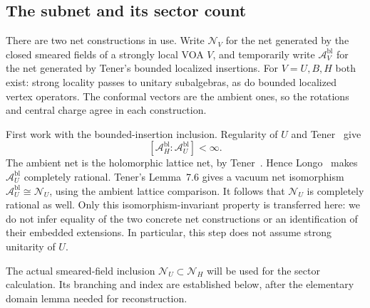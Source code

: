 \subsection{The subnet and its sector count}
\label{subsec:analytic-net-count}

There are two net constructions in use.  Write $\mathcal N_V$ for the
net generated by the closed smeared fields of a strongly local VOA $V$,
and temporarily write $\mathcal A_V^{\mathrm{bl}}$ for the net generated
by Tener's bounded localized insertions.  For $V=U,B,H$ both exist:
strong locality passes to unitary subalgebras, as do bounded localized
vertex operators.  The conformal vectors are the ambient ones, so the
rotations and central charge agree in each construction.

First work with the bounded-insertion inclusion.  Regularity of $U$
and Tener~\cite[Corollary~4.24]{TenFusion} give
\[
 [\mathcal A_H^{\mathrm{bl}}:\mathcal A_U^{\mathrm{bl}}]<\infty.
\]
The ambient net is the holomorphic lattice net, by
Tener~\cite[Proposition~7.5]{TenFields}.  Hence
Longo~\cite[Theorem~24]{Longo} makes $\mathcal A_U^{\mathrm{bl}}$ completely
rational.  Tener's Lemma~7.6 gives a vacuum net isomorphism
$\mathcal A_U^{\mathrm{bl}}\cong\mathcal N_U$, using the ambient
lattice comparison.  It follows that $\mathcal N_U$ is completely
rational as well.  Only this isomorphism-invariant property is
transferred here: we do not infer equality of the two concrete net
constructions or an identification of their embedded extensions.
In particular, this step does not assume strong unitarity of $U$.

The actual smeared-field inclusion $\mathcal N_U\subset\mathcal N_H$
will be used for the sector calculation.  Its branching and index are
established below, after the elementary domain lemma needed for
reconstruction.

